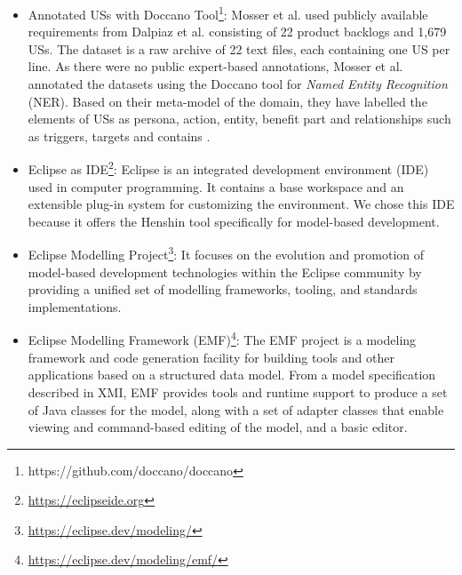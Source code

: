 \begin{itemize}
	\item Annotated USs with Doccano Tool\footnote{https://github.com/doccano/doccano}: Mosser et al. used publicly available requirements from Dalpiaz et al.\cite{Dalpiaz2018} consisting of 22 product backlogs and 1,679 USs. The dataset is a raw archive of 22 text files, each containing one US per line. As there were no public expert-based annotations, Mosser et al. annotated the datasets using the Doccano tool for \textit{Named Entity Recognition} (NER). Based on their meta-model of the domain, they have labelled the elements of USs as persona, action, entity, benefit part and relationships such as triggers, targets and contains \cite{mosser2022modelling}.
	
	
	\item Eclipse as IDE\footnote{\href{https://eclipseide.org/}{https://eclipseide.org}}: Eclipse is an integrated development environment (IDE) used in computer programming. It contains a base workspace and an extensible plug-in system for customizing the environment.
	We chose this IDE because it offers the Henshin tool specifically for model-based development.
	
	\item Eclipse Modelling Project\footnote{\href{https://eclipse.dev/modeling/}{https://eclipse.dev/modeling/}}: It focuses on the evolution and promotion of model-based development technologies within the Eclipse community by providing a unified set of modelling frameworks, tooling, and standards implementations.
	
	\item Eclipse Modelling Framework (EMF)\footnote{\href{https://eclipse.dev/modeling/emf/}{https://eclipse.dev/modeling/emf/}}: The EMF project is a modeling framework and code generation facility for building tools and other applications based on a structured data model. From a model specification described in XMI, EMF provides tools and runtime support to produce a set of Java classes for the model, along with a set of adapter classes that enable viewing and command-based editing of the model, and a basic editor.
	

\end{itemize}
